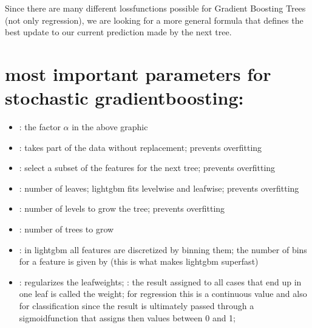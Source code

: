 \documentclass[letterpaper,10pt,english]{jupyterBook}
\begin{document}
\sphinxAtStartPar
Since there are many different loss\sphinxhyphen{}functions possible for Gradient Boosting Trees (not only regression), we are looking for a more general formula that defines the best update to our current prediction made by the next tree.


\section{most important parameters for stochastic gradient\sphinxhyphen{}boosting:}
\label{\detokenize{Tree_Methods:most-important-parameters-for-stochastic-gradient-boosting}}\begin{itemize}
\item {} 
\sphinxAtStartPar
{}: the factor \(\alpha\) in the above graphic

\item {} 
\sphinxAtStartPar
{}: takes part of the data without replacement; prevents overfitting

\item {} 
\sphinxAtStartPar
{}: select a subset of the features for the next tree; prevents overfitting

\item {} 
\sphinxAtStartPar
{}: number of leaves; lightgbm fits level\sphinxhyphen{}wise and leaf\sphinxhyphen{}wise; prevents overfitting

\item {} 
\sphinxAtStartPar
{}: number of levels to grow the tree; prevents overfitting

\item {} 
\sphinxAtStartPar
{}: number of trees to grow

\item {} 
\sphinxAtStartPar
{}: in lightgbm all features are discretized by binning them; the number of bins for a feature is given by  (this is what makes lightgbm super\sphinxhyphen{}fast)

\item {} 
\sphinxAtStartPar
{}: regularizes the leaf\sphinxhyphen{}weights; : the result assigned to all cases that end up in one leaf is called the weight; for regression this is a continuous value and also for classification since the result is ultimately passed through a sigmoid\sphinxhyphen{}function that assigns then values between 0 and 1; 

\end{itemize}
\end{document}
